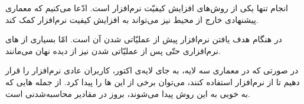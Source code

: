 
انجام  تنها یکی از روش‌های افزایش کیفیّت نرم‌افزار است. ادّعا می‌کنیم که معماری پیشنهادی خارج از محیط  نیز می‌تواند به افزایش کیفیت نرم‌افزار کمک کند.

در هنگام  هدف یافتن  نرم‌افزار پیش از عملیّاتی شدن آن است. امّا بسیاری از های نرم‌افزاری حتّی پس از عملیّاتی شدن نیز از دیده نهان می‌مانند.

در صورتی که در معماری سه لایه، به جای لایه‌ی اکتور، کاربران عادی نرم‌افزار را قرار دهیم تا از نرم‌افزار استفاده کنند، می‌توان برخی از این ها را پیدا کرد. از جمله هایی که به خوبی به این روش پیدا می‌شوند، بروز  در مقادیر محاسبه‌شدنی است.
